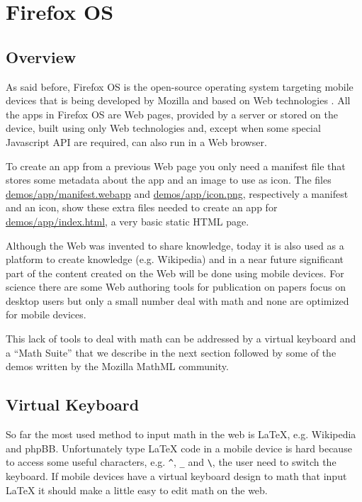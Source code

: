 \section{Firefox OS}
\label{sec:firefoxOS}

\subsection{Overview}

As said before,
Firefox OS is the open-source operating system targeting mobile devices that
is being
developed by Mozilla and based on Web technologies \cite{MozillaFirefoxOS}.
All the apps in Firefox OS
are Web pages, provided by a server or stored on the device, built using only Web
technologies and, except when
some special Javascript API are required, can also run in a Web browser.

To create an app from a previous Web page you only need a manifest
file that stores some metadata about the app and an image to use as icon. The
files
\href{http://fred-wang.github.io/MathUI2014/demos/app/manifest.webapp}{demos/app/manifest.webapp}
and
\href{http://fred-wang.github.io/MathUI2014/demos/app/icon.png}{demos/app/icon.png},
respectively a manifest and an icon,
show these extra files needed to create an app for
\href{http://fred-wang.github.io/MathUI2014/demos/app/index.html}{demos/app/index.html},
a very basic static HTML page.

Although the Web was invented to share knowledge, today it is also used
as a platform to create knowledge (e.g. Wikipedia) and in a near future
significant part of the content created on the Web will be done using mobile
devices. For science there are some Web authoring tools for publication on
papers focus on desktop users but only a small number deal with math and none
are optimized for mobile devices.

This lack of tools to deal with math can be addressed by a virtual keyboard
and a ``Math Suite'' that
we describe in the next section followed by some of the demos written by the
Mozilla MathML community.

\subsection{Virtual Keyboard}
\label{sec:virtualkeyboard}

So far the most used method to input math in the web is LaTeX, e.g. Wikipedia
and phpBB. Unfortunately type LaTeX code in a mobile device is hard because to
access some useful characters, e.g. {\tt \textasciicircum}, {\tt \_}
and {\tt \textbackslash}, the
user need to switch the keyboard. If mobile devices have a virtual keyboard
design to math that input LaTeX it should make a little easy to edit math on
the web.

